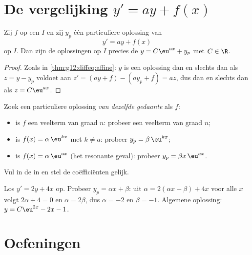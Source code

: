 \section{De vergelijking \texorpdfstring{$y' = ay + f(x)$}{y' = ay + f(x)}}

\begin{proposition}\label{prop:g12:diffeq:general}
Zij $f$  op een  $I$ en zij $y_p$ één particuliere oplossing
van
\[
y' = ay + f(x)
\]
op $I$. Dan zijn de oplossingen op $I$ precies de 
$y = C\eu^{ax} + y_p$ met $C \in \R$.
\end{proposition}

\begin{proof}
Zoals in \cref{thm:g12:diffeq:affine}: $y$ is een oplossing dan en slechts
dan als $z = y - y_p$ voldoet aan $z' = (ay + f) - (ay_p + f) = az$, dus dan
en slechts dan als $z = C\eu^{ax}$.
\end{proof}

\begin{method}\label{met:g12:diffeq:particular}
Zoek een particuliere oplossing \emph{van dezelfde gedaante} als $f$:
\begin{itemize}
  \item is $f$ een veelterm van graad $n$: probeer een veelterm van graad
        $n$;
  \item is $f(x) = \alpha\,\eu^{kx}$ met $k \neq a$: probeer
        $y_p = \beta\,\eu^{kx}$;
  \item is $f(x) = \alpha\,\eu^{ax}$ (het resonante geval): probeer
        $y_p = \beta x\,\eu^{ax}$.
\end{itemize}
Vul in de  in en stel de coëfficiënten gelijk.
\end{method}

\begin{example}\label{ex:g12:diffeq:particular}
Los $y' = 2y + 4x$ op. Probeer $y_p = \alpha x + \beta$: uit
$\alpha = 2(\alpha x + \beta) + 4x$ voor alle $x$ volgt $2\alpha + 4 = 0$ en
$\alpha = 2\beta$, dus $\alpha = -2$ en $\beta = -1$. Algemene oplossing:
$y = C\eu^{2x} - 2x - 1$.
\end{example}

\section{Oefeningen}


